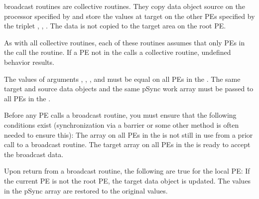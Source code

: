 {   
\openshmem broadcast routines are collective routines.
They copy data object source on the processor specified by  and
store the values at target on the other \ac{PE}s specified by the triplet
, , . The data is not copied to the target
area on the root \ac{PE}.

As with all \openshmem collective routines, each of these routines assumes
that only \ac{PE}s in the \activeset{} call the routine. If a \ac{PE} not in the
\activeset{} calls a \openshmem collective routine, undefined behavior
results.

The values of arguments , , , and 
must be equal on all \ac{PE}s in the \activeset. The same target and source
data objects and the same pSync work array must be passed to all \ac{PE}s in
the \activeset.

Before any \ac{PE} calls a broadcast	routine, you must ensure that the
following conditions exist (synchronization via a barrier or some other
method is often needed to ensure this): The  array on all \ac{PE}s in
the \activeset{} is not still in use from a prior call to a broadcast
routine. The target array on all \ac{PE}s in the \activeset{} is ready to
accept the broadcast data.

Upon return from a broadcast routine, the following are true for the
local \ac{PE}: If the current \ac{PE} is not the root \ac{PE}, the target data	object
is updated. The values in the pSync array are restored to the original
values.
}
